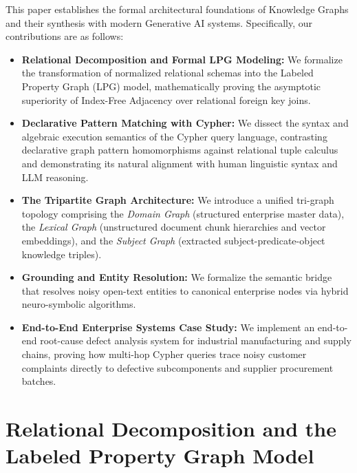 \documentclass[10pt,twocolumn,letterpaper]{article}
\begin{document}
This paper establishes the formal architectural foundations of Knowledge Graphs and their synthesis with modern Generative AI systems. Specifically, our contributions are as follows:
\begin{itemize}
    \item \textbf{Relational Decomposition and Formal LPG Modeling:} We formalize the transformation of normalized relational schemas into the Labeled Property Graph (LPG) model, mathematically proving the asymptotic superiority of Index-Free Adjacency over relational foreign key joins.
    \item \textbf{Declarative Pattern Matching with Cypher:} We dissect the syntax and algebraic execution semantics of the Cypher query language, contrasting declarative graph pattern homomorphisms against relational tuple calculus and demonstrating its natural alignment with human linguistic syntax and LLM reasoning.
    \item \textbf{The Tripartite Graph Architecture:} We introduce a unified tri-graph topology comprising the \textit{Domain Graph} (structured enterprise master data), the \textit{Lexical Graph} (unstructured document chunk hierarchies and vector embeddings), and the \textit{Subject Graph} (extracted subject-predicate-object knowledge triples).
    \item \textbf{Grounding and Entity Resolution:} We formalize the semantic bridge that resolves noisy open-text entities to canonical enterprise nodes via hybrid neuro-symbolic algorithms.
    \item \textbf{End-to-End Enterprise Systems Case Study:} We implement an end-to-end root-cause defect analysis system for industrial manufacturing and supply chains, proving how multi-hop Cypher queries trace noisy customer complaints directly to defective subcomponents and supplier procurement batches.
\end{itemize}

\section{Relational Decomposition and the Labeled Property Graph Model}
\label{sec:lpg_formalism}
\end{document}
